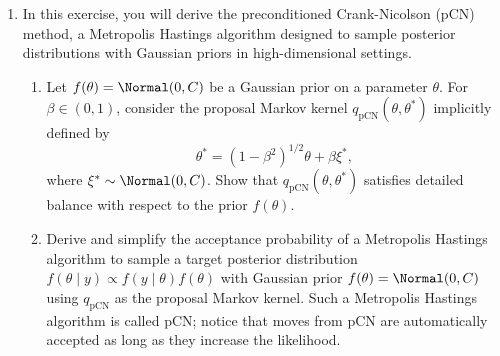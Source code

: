 \begin{enumerate}
\item[4.6] In this exercise, you will derive the preconditioned Crank-Nicolson (pCN)
method, a Metropolis Hastings algorithm designed to sample posterior distributions with Gaussian priors in high-dimensional settings.

\begin{enumerate}
\item Let $f(\theta) = \Normal(0, C)$ be a Gaussian prior on a parameter $\theta$. For $\beta \in (0,1)$, consider the
proposal Markov kernel $q_{\mathrm{pCN}}(\theta, \theta^*)$ implicitly defined by
\begin{equation}
  \theta^* = (1 - \beta^2)^{1/2} \theta + \beta \xi^*,
  \label{eq:4.2}
\end{equation}
where $\xi^* \sim \Normal(0, C)$. Show that $q_{\mathrm{pCN}}(\theta, \theta^*)$ satisfies detailed balance with respect to the
prior $f(\theta)$.

\item Derive and simplify the acceptance probability of a Metropolis Hastings algorithm to
sample a target posterior distribution $f(\theta \mid y) \propto f(y\mid\theta) f(\theta)$ with Gaussian prior $f(\theta) =
\Normal(0, C)$ using $q_{\mathrm{pCN}}$ as the proposal Markov kernel. Such a Metropolis Hastings algorithm
is called pCN; notice that moves from pCN are automatically accepted as long as they
increase the likelihood.
\end{enumerate}

\end{enumerate}
